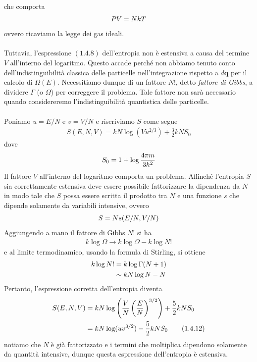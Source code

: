 \documentclass{article}
\begin{document}
che comporta
\begin{gather}
    PV = NkT \notag
\end{gather}
ovvero ricaviamo la legge dei gas ideali. \\ \\
Tuttavia, l'espressione $(1.4.8)$ dell'entropia non è estensiva a causa del termine $V$ all'interno del logaritmo. Questo accade perché non abbiamo tenuto conto dell'indistinguibilità classica delle particelle nell'integrazione rispetto a $d\mathbf{q}$ per il calcolo di $\Omega(E)$. Necessitiamo dunque di un fattore $N!$, detto \textit{fattore di Gibbs}, a dividere $\Gamma$ (o $\Omega$) per correggere il problema. Tale fattore non sarà necessario quando considereremo l'indistinguibilità quantistica delle particelle. \\ \\
Poniamo $u = E/N$ e $v = V/N$ e riscriviamo $S$ come segue
\begin{align}
    S(E, N, V) = kN\log(Vu^{2/3}) + \frac{3}{2}kNS_0 \tag{1.4.10}
\end{align}
dove
\begin{align}
    S_0 = 1 + \log\frac{4\pi m}{3h^2} \notag
\end{align}
Il fattore $V$ all'interno del logaritmo comporta un problema. Affinché l'entropia $S$ sia correttamente estensiva deve essere possibile fattorizzare la dipendenza da $N$ in modo tale che $S$ possa essere scritta il prodotto tra $N$ e una funzione $s$ che dipende solamente da variabili intensive, ovvero
\begin{align}
    S = Ns(E/N, V/N) \notag
\end{align}
Aggiungendo a mano il fattore di Gibbs $N!$ si ha
\begin{align}
    k\log\Omega \longrightarrow k\log\Omega - k\log N! \tag{1.4.11}
\end{align}
e al limite termodinamico, usando la formula di Stirling, si ottiene
\begin{align}
    k\log N! &= k\log\Gamma(N + 1) \notag \\
    &\sim kN\log N - N \notag
\end{align}
Pertanto, l'espressione corretta dell'entropia diventa
\begin{align}
    S(E, N, V) &= kN\log\left(\frac{V}{N}\left(\frac{E}{N}\right)^{3/2}\right) + \frac{5}{2}kNS_0 \notag \\
    &= kN\log(uv^{3/2}) - \frac{5}{2}kNS_0 \tag{1.4.12}
\end{align}
notiamo che $N$ è già fattorizzato e i termini che moltiplica dipendono solamente da quantità intensive, dunque questa espressione dell'entropia è estensiva. 
\end{document}
